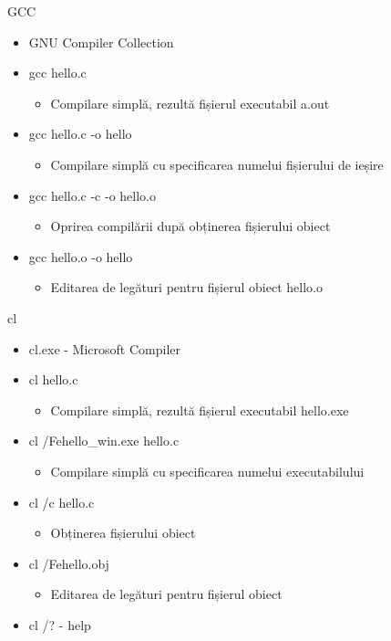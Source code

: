 \documentclass{so.cs.pub.ro}
\begin{document}
\begin{frame}{GCC}
	\begin{itemize}
		\item GNU Compiler Collection
		\item gcc hello.c
		\begin{itemize}
			\item Compilare simplă, rezultă fișierul executabil a.out
		\end{itemize}
		\item gcc hello.c -o hello
		\begin{itemize}
			\item Compilare simplă cu specificarea numelui fișierului de ieșire
		\end{itemize}
		\item gcc hello.c -c -o hello.o
		\begin{itemize}
			\item Oprirea compilării după obținerea fișierului obiect
		\end{itemize}
		\item gcc hello.o -o hello
		\begin{itemize}
			\item Editarea de legături pentru fișierul obiect hello.o
		\end{itemize}
	\end{itemize}
\end{frame}

\begin{frame}{cl}
	\begin{itemize}
		\item cl.exe - Microsoft Compiler
		\item cl hello.c
		\begin{itemize}
			\item Compilare simplă, rezultă fișierul executabil hello.exe
		\end{itemize}
		\item cl /Fehello\_win.exe hello.c
		\begin{itemize}
			\item Compilare simplă cu specificarea numelui executabilului
		\end{itemize}
		\item cl /c hello.c
		\begin{itemize}
			\item Obținerea fișierului obiect
		\end{itemize}
		\item cl /Fehello.obj
		\begin{itemize}
			\item Editarea de legături pentru fișierul obiect
		\end{itemize}
		\item cl /? - help
	\end{itemize}
\end{frame}
\end{document}
